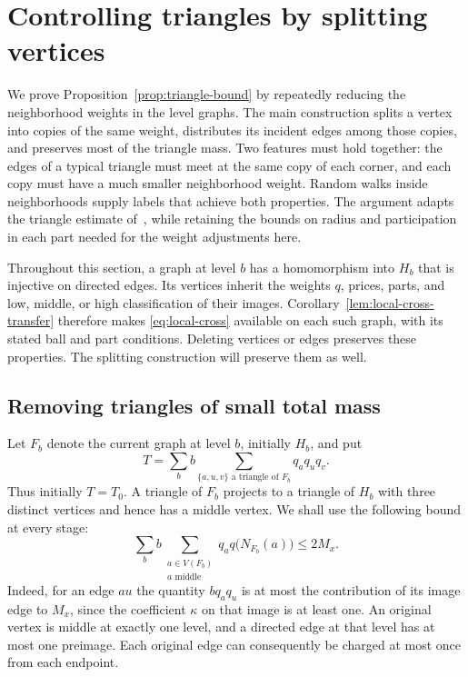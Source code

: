 \section{Controlling triangles by splitting vertices}
\label{sec:triangles}

We prove Proposition~\ref{prop:triangle-bound} by repeatedly reducing the
neighborhood weights in the level graphs.  The main construction splits a
vertex into copies of the same weight, distributes its incident edges among
those copies, and preserves most of the triangle mass.  Two features must hold together: the
edges of a typical triangle must meet at the same copy of each corner, and
each copy must have a much smaller neighborhood weight.  Random walks inside
neighborhoods supply labels that achieve both properties.  The argument
adapts the triangle estimate of~\cite[Sections~3--5]{OpenAIIndependence},
while retaining the bounds on radius and participation in each part
needed for the weight adjustments here.

Throughout this section, a graph at level $b$ has a homomorphism into $H_b$
that is injective on directed edges.  Its vertices inherit the weights $q$,
prices, parts, and low, middle, or high classification of their images.
Corollary~\ref{lem:local-cross-transfer} therefore makes
\eqref{eq:local-cross} available on each such graph, with its stated ball and
part conditions.  Deleting vertices or edges preserves these properties.
The splitting construction will preserve them as well.

\subsection{Removing triangles of small total mass}
\label{subsec:triangle-preparation}

Let $F_b$ denote the current graph at level $b$, initially $H_b$, and put
\[
 T=\sum_b b\sum_{\{a,u,v\}\text{ a triangle of }F_b}q_aq_uq_v.
\]
Thus initially $T=T_0$.  A triangle of $F_b$ projects to a triangle of
$H_b$ with three distinct vertices and hence has a middle vertex.  We shall
use the following bound at every stage:
\begin{equation}
 \sum_b b\sum_{\substack{a\in V(F_b)\\a\text{ middle}}}
             q_a q\bigl(N_{F_b}(a)\bigr)\le 2M_x.
 \label{eq:middle-edge-charge}
\end{equation}
Indeed, for an edge $au$ the quantity $bq_aq_u$ is at most the contribution
of its image edge to $M_x$, since the coefficient $\kappa$ on that image is
at least one.  An original vertex is middle at exactly one level, and a
directed edge at that level has at most one preimage.  Each original edge
can consequently be charged at most once from each endpoint.

